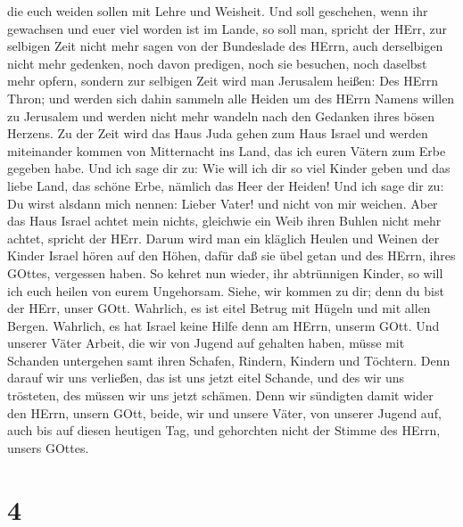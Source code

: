 die euch weiden sollen mit Lehre und Weisheit.  Und soll
geschehen, wenn ihr gewachsen und euer viel worden ist im Lande, so soll
man, spricht der HErr, zur selbigen Zeit nicht mehr sagen von der
Bundeslade des HErrn, auch derselbigen nicht mehr gedenken, noch davon
predigen, noch sie besuchen, noch daselbst mehr opfern, 
sondern zur selbigen Zeit wird man Jerusalem heißen: Des HErrn Thron;
und werden sich dahin sammeln alle Heiden um des HErrn Namens willen zu
Jerusalem und werden nicht mehr wandeln nach den Gedanken ihres bösen
Herzens.  Zu der Zeit wird das Haus Juda gehen zum Haus
Israel und werden miteinander kommen von Mitternacht ins Land, das ich
euren Vätern zum Erbe gegeben habe.  Und ich sage dir zu:
Wie will ich dir so viel Kinder geben und das liebe Land, das schöne
Erbe, nämlich das Heer der Heiden! Und ich sage dir zu: Du wirst alsdann
mich nennen: Lieber Vater! und nicht von mir weichen.  Aber
das Haus Israel achtet mein nichts, gleichwie ein Weib ihren Buhlen
nicht mehr achtet, spricht der HErr.  Darum wird man ein
kläglich Heulen und Weinen der Kinder Israel hören auf den Höhen, dafür
daß sie übel getan und des HErrn, ihres GOttes, vergessen haben.
 So kehret nun wieder, ihr abtrünnigen Kinder, so will ich
euch heilen von eurem Ungehorsam. Siehe, wir kommen zu dir; denn du bist
der HErr, unser GOtt.  Wahrlich, es ist eitel Betrug mit
Hügeln und mit allen Bergen. Wahrlich, es hat Israel keine Hilfe denn am
HErrn, unserm GOtt.  Und unserer Väter Arbeit, die wir von
Jugend auf gehalten haben, müsse mit Schanden untergehen samt ihren
Schafen, Rindern, Kindern und Töchtern.  Denn darauf wir
uns verließen, das ist uns jetzt eitel Schande, und des wir uns
trösteten, des müssen wir uns jetzt schämen. Denn wir sündigten damit
wider den HErrn, unsern GOtt, beide, wir und unsere Väter, von unserer
Jugend auf, auch bis auf diesen heutigen Tag, und gehorchten nicht der
Stimme des HErrn, unsers GOttes.

\hypertarget{section-3}{%
\section{4}\label{section-3}}

